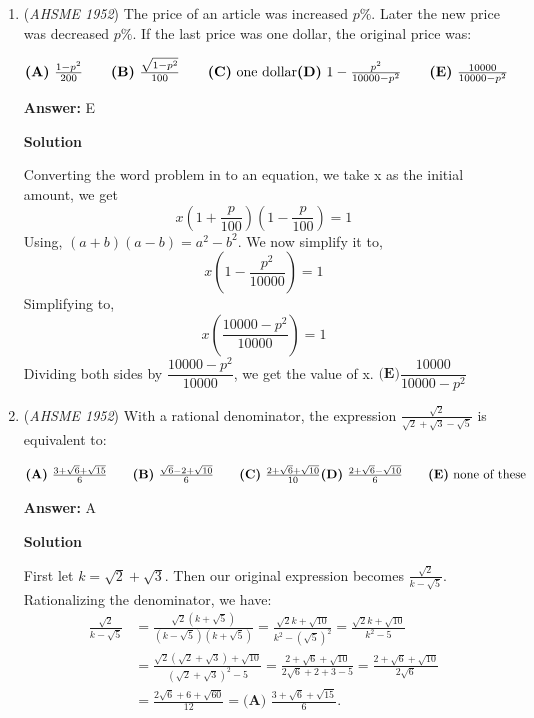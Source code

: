 \begin{enumerate}
 


	\item (\textit{AHSME 1952}) The price of an article was increased $p\%$. Later the new price was decreased $p\%$. If the last price was one dollar, the original price was: 


 $\textbf{(A)}\ \frac{1-p^2}{200}\qquad \textbf{(B)}\ \frac{\sqrt{1-p^2}}{100}\qquad \textbf{(C)}\ \text{one dollar}\qquad\\ \textbf{(D)}\ 1-\frac{p^2}{10000-p^2}\qquad \textbf{(E)}\ \frac{10000}{10000-p^2}$

 \textbf{Answer: }E



\textbf{Solution}

Converting the word problem in to an equation, we take x as the initial amount, we get 
 \[x(1+\dfrac{p}{100})(1-\dfrac{p}{100}) = 1\] Using, $(a+b)(a-b) = a^{2} - b^{2}$. We now simplify it to, 
 \[x(1-\dfrac{p^{2}}{10000})=1\] Simplifying to, 
 \[x(\dfrac{10000-p^{2}}{10000}) = 1\] Dividing both sides by $\dfrac{10000-p^{2}}{10000}$, we get the value of x. $\boxed{\textbf{(E)}\dfrac{10000}{10000-p^{2}}}$



	\item (\textit{AHSME 1952}) With a rational denominator, the expression $\frac {\sqrt {2}}{\sqrt {2} + \sqrt {3} - \sqrt {5}}$ is equivalent to: 


 $\textbf{(A)}\ \frac {3 + \sqrt {6} + \sqrt {15}}{6} \qquad \textbf{(B)}\ \frac {\sqrt {6} - 2 + \sqrt {10}}{6} \qquad \textbf{(C)}\ \frac{2+\sqrt{6}+\sqrt{10}}{10} \qquad\\ \textbf{(D)}\ \frac {2 + \sqrt {6} - \sqrt {10}}{6} \qquad \textbf{(E)}\ \text{none of these}$

 \textbf{Answer: }A



\textbf{Solution}

First let $k=\sqrt2+\sqrt3$. Then our original expression becomes $\frac{\sqrt2}{k-\sqrt5}$. Rationalizing the denominator, we have: \begin{align*}\frac{\sqrt2}{k-\sqrt5}&=\frac{\sqrt2(k+\sqrt5)}{(k-\sqrt5)(k+\sqrt5)}=\frac{\sqrt{2}k+\sqrt{10}}{k^2-(\sqrt5)^2}=\frac{\sqrt{2}k+\sqrt{10}}{k^2-5} \\&=\frac{\sqrt{2}(\sqrt{2}+\sqrt{3})+\sqrt{10}}{(\sqrt{2}+\sqrt{3})^2-5}= \frac{2+\sqrt{6}+\sqrt{10}}{2\sqrt{6}+2+3-5}=\frac{2+\sqrt6+\sqrt{10}}{2\sqrt{6}} \\&=\frac{2\sqrt{6}+6+\sqrt{60}}{12}=\boxed{\textbf{(A) }\frac{3+\sqrt{6}+\sqrt{15}}{6}}.\end{align*}



\end{enumerate}
